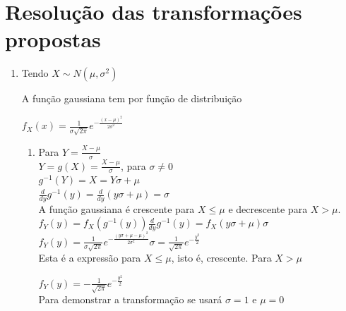 \documentclass{article}
\begin{document}
\section{Resolução das transformações propostas}

\begin{enumerate}
  \item Tendo $X \sim N(\mu,\sigma^2)$
  
    A função gaussiana tem por função de distribuição

    $f_X(x) = \frac{1}{\sigma\sqrt{2\pi}}e^{-\frac{(x-\mu)^2}{2\sigma^2}}$
    
    \begin{enumerate}
      \item Para $Y = \frac{X-\mu}{\sigma}$\\
        
        $Y = g(X) = \frac{X-\mu}{\sigma}$, para $\sigma \neq 0$\\

        $g^{-1}(Y) = X = Y\sigma+\mu$\\

        $\frac{d}{dy}g^{-1}(y) = \frac{d}{dy}(y\sigma+\mu) = \sigma$\\

        A função gaussiana é crescente para $X \leq \mu$ e decrescente para $X > \mu$.\\

        $f_Y(y) = f_X(g^{-1}(y))\frac{d}{dy}g^{-1}(y) = f_X(y\sigma+\mu)\sigma$\\

        $f_Y(y) = \frac{1}{\sigma\sqrt{2\pi}}e^{-\frac{(y\sigma+\mu-\mu)^2}{2\sigma^2}}\sigma = \frac{1}{\sqrt{2\pi}}e^{-\frac{y^2}{2}}$\\
        

        Esta é a expressão para $X \leq \mu$, isto é, crescente. Para $X > \mu$
        
        $f_Y(y) = -\frac{1}{\sqrt{2\pi}}e^{-\frac{y^2}{2}}$\\

        Para demonstrar a transformação se usará $\sigma=1$ e $\mu=0$\\
        

\end{enumerate}
\end{enumerate}
\end{document}

